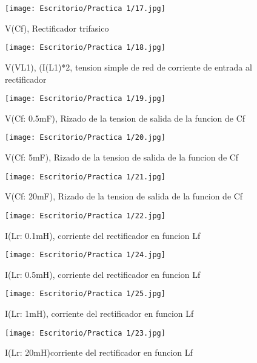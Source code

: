 \documentclass[11pt,a4paper]{article}
\begin{document}
\begin{figure}[hbtp]
\centering
\texttt{[image: Escritorio/Practica 1/17.jpg]}
\caption{V(Cf), Rectificador trifasico}
\end{figure}

\begin{figure}[hbtp]
\centering
\texttt{[image: Escritorio/Practica 1/18.jpg]}
\caption{V(VL1), (I(L1)*2, tension simple de red de corriente de entrada al rectificador}
\end{figure}


\begin{figure}[hbtp]
\centering
\texttt{[image: Escritorio/Practica 1/19.jpg]}
\caption{V(Cf: 0.5mF), Rizado de la tension de salida de la funcion de Cf}
\end{figure}

\begin{figure}[hbtp]
\centering
\texttt{[image: Escritorio/Practica 1/20.jpg]}
\caption{V(Cf: 5mF), Rizado de la tension de salida de la funcion de Cf}
\end{figure}

\begin{figure}[hbtp]
\centering
\texttt{[image: Escritorio/Practica 1/21.jpg]}
\caption{V(Cf: 20mF), Rizado de la tension de salida de la funcion de Cf}
\end{figure}

\begin{figure}[hbtp]
\centering
\texttt{[image: Escritorio/Practica 1/22.jpg]}
\caption{I(Lr: 0.1mH), corriente del rectificador en funcion Lf}
\end{figure}

\begin{figure}[hbtp]
\centering
\texttt{[image: Escritorio/Practica 1/24.jpg]}
\caption{I(Lr: 0.5mH), corriente del rectificador en funcion Lf}
\end{figure}

\begin{figure}[hbtp]
\centering
\texttt{[image: Escritorio/Practica 1/25.jpg]}
\caption{I(Lr: 1mH), corriente del rectificador en funcion Lf}
\end{figure}

\begin{figure}[hbtp]
\centering
\texttt{[image: Escritorio/Practica 1/23.jpg]}
\caption{I(Lr: 20mH)corriente del rectificador en funcion Lf}
\end{figure}
\end{document}
